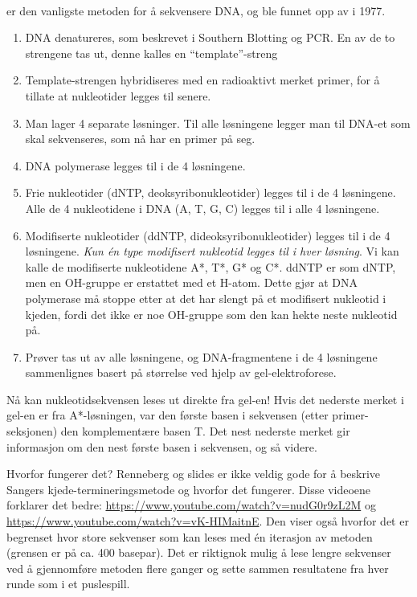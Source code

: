 \paragraph{} er den vanligste metoden for å sekvensere DNA, og ble funnet opp av  i 1977. 
\begin{enumerate}
	\item DNA denatureres, som beskrevet i Southern Blotting og PCR. En av de to strengene tas ut, denne kalles en ``template''-streng
	\item Template-strengen hybridiseres med en radioaktivt merket primer, for å tillate at nukleotider legges til senere.
	\item Man lager 4 separate løsninger. Til alle løsningene legger man til DNA-et som skal sekvenseres, som nå har en primer på seg.
	\item DNA polymerase legges til i de 4 løsningene.
	\item Frie nukleotider (dNTP, deoksyribonukleotider) legges til i de 4 løsningene. Alle de 4 nukleotidene i DNA (A, T, G, C) legges til i alle 4 løsningene.
	\item Modifiserte nukleotider (ddNTP, dideoksyribonukleotider) legges til i de 4 løsningene. \emph{Kun én type modifisert nukleotid legges til i hver løsning}. Vi kan kalle de modifiserte nukleotidene A*, T*, G* og C*. ddNTP er som dNTP, men en OH-gruppe er erstattet med et H-atom. Dette gjør at DNA polymerase må stoppe etter at det har slengt på et modifisert nukleotid i kjeden, fordi det ikke er noe OH-gruppe som den kan hekte neste nukleotid på.
	\item Prøver tas ut av alle løsningene, og DNA-fragmentene i de 4 løsningene sammenlignes basert på størrelse ved hjelp av gel-elektroforese.
\end{enumerate}
Nå kan nukleotidsekvensen leses ut direkte fra gel-en! Hvis det nederste merket i gel-en er fra A*-løsningen, var den første basen i sekvensen (etter primer-seksjonen) den komplementære basen T. Det nest nederste merket gir informasjon om den nest første basen i sekvensen, og så videre.

Hvorfor fungerer det? Renneberg og slides er ikke veldig gode for å beskrive Sangers kjede-termineringsmetode og hvorfor det fungerer. Disse videoene forklarer det bedre: \url{https://www.youtube.com/watch?v=nudG0r9zL2M} og \url{https://www.youtube.com/watch?v=vK-HIMaitnE}. Den viser også hvorfor det er begrenset hvor store sekvenser som kan leses med én iterasjon av metoden (grensen er på ca. 400 basepar). Det er riktignok mulig å lese lengre sekvenser ved å gjennomføre metoden flere ganger og sette sammen resultatene fra hver runde som i et puslespill.

